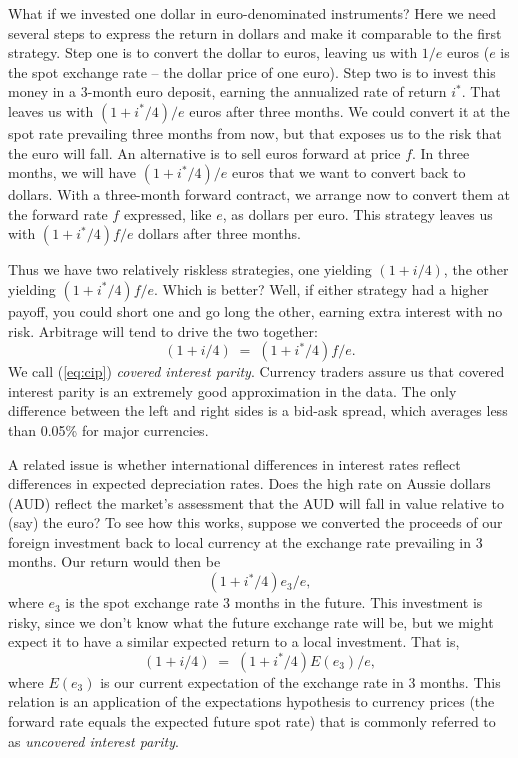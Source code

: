 \documentclass[letterpaper,12pt]{article}
\begin{document}
What if we invested one dollar in euro-denominated instruments? Here
we need several steps to express the return in dollars and make it
comparable to the first strategy. Step one is to convert the dollar
to euros, leaving us with $1/e$ euros ($e$ is the spot exchange rate
-- the dollar price of one euro). Step two is to invest this money
in a 3-month euro deposit, earning the annualized rate of return
$i^{*}$. That leaves us with $(1+i^{*}/4)/e$ euros after three
months. We could convert it at the spot rate prevailing three months
from now, but that exposes us to the risk that the euro will fall.
An alternative is to sell euros forward at price $f$. In three
months, we will have $(1+i^{*}/4)/e$ euros that we want to convert
back to dollars. With a three-month forward contract, we arrange now
to convert them at the forward rate $f$ expressed, like $e$, as
dollars per euro. This strategy leaves us with $(1+i^{*}/4)f/e$
dollars after three months.

Thus we have two relatively riskless  strategies, one yielding
$(1+i/4)$, the other yielding $(1+i^{*}/4)f/e$. Which is better?
Well, if either strategy had a higher payoff, you could short one
and go long the other, earning extra interest with no risk.
Arbitrage will tend to drive the two together:
\begin{equation}
                            (1+i/4) \;=\; (1+i^{*}/4)f/e.
                            \label{eq:cip}
\end{equation}
We call (\ref{eq:cip}) {\it covered interest parity\/}.
Currency traders assure us that covered interest parity
is an extremely good approximation in the data.
The only difference between the left and right sides is a bid-ask spread,
which averages less than 0.05\% for major currencies.


A related issue is whether international differences
in interest rates reflect differences in expected depreciation rates.
Does the high rate on Aussie dollars (AUD)
reflect the market's assessment that
the AUD will fall in value relative to (say) the euro?
To see how this works, suppose
we converted the proceeds of our foreign investment
back to local currency at the exchange rate prevailing
in 3 months.  Our return would then be
\[
                            (1+i^{*}/4) e_{3}/e ,
\]
where $e_3$ is the spot exchange rate 3 months in the future.
This investment is risky, since we don't know what the
future exchange rate will be, but we might expect
it to have a similar expected return to a local investment.
That is,
\begin{equation}
                            (1+i/4) \;=\; (1+i^{*}/4) E (e_{3})/e ,
                            \label{eq:uip}
\end{equation}
where $E(e_3)$ is our current expectation
of the exchange rate in 3 months.
This relation is an application of the expectations hypothesis to
currency prices (the forward rate equals the expected future spot rate)
that is commonly referred to as {\it uncovered interest parity\/}.
\end{document}
